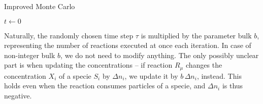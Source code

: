 \begin{algorithm}
\caption{Improved Monte Carlo}\label{alg:mcadvanced}

$t \gets 0$\\
\end{algorithm}

Naturally, the randomly chosen time step $\tau$ is multiplied by the parameter bulk $b$, representing the number of reactions executed at once each iteration. In case of non-integer bulk $b$, we do not need to modify anything. The only possibly unclear part is when updating the concentrations -- if reaction $R_\mu$ changes the concentration $X_i$ of a specie $S_i$ by $\Delta n_i$, we update it by $b\, \Delta n_i$, instead. This holds even when the reaction consumes particles of a specie, and $\Delta n_i$ is thus negative.

